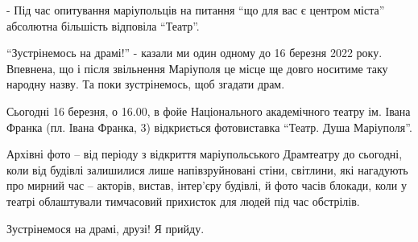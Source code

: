 - Під час опитування маріупольців на питання \enquote{що для вас є центром міста}
абсолютна більшість відповіла \enquote{Театр}.

\enquote{Зустрінемось на драмі!} - казали ми один одному до 16 березня 2022 року.
Впевнена, що і після звільнення Маріуполя це місце ще довго носитиме таку
народну назву. Та поки зустрінемось, щоб згадати драм.

Сьогодні  16 березня, о 16.00, в фойе Національного академічного театру ім.
Івана Франка (пл. Івана Франка, 3) відкриється фотовиставка \enquote{Театр. Душа
Маріуполя}. 

Архівні фото – від періоду з відкриття маріупольського Драмтеатру до сьогодні,
коли від будівлі залишилися лише напівзруйновані стіни, світлини, які нагадують
про мирний час – акторів, вистав, інтер'єру будівлі, й фото часів блокади, коли
у театрі облаштували тимчасовий прихисток для людей під час обстрілів.

Зустрінемося на драмі, друзі! Я прийду.

